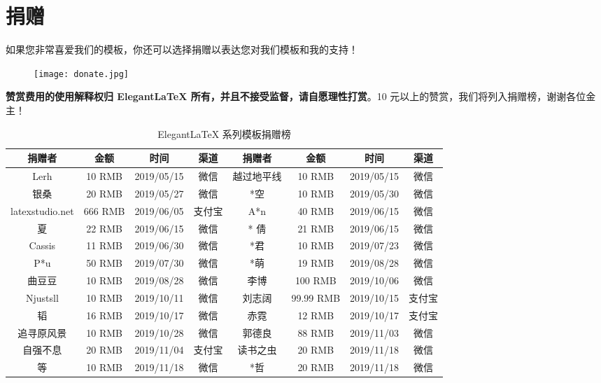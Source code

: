\documentclass[lang=cn,11pt,a4paper,cite=authoryear]{elegantpaper}
\begin{document}
\section{捐赠}
如果您非常喜爱我们的模板，你还可以选择捐赠以表达您对我们模板和我的支持！

\begin{figure}[htbp]
  \centering
  \texttt{[image: donate.jpg]}
\end{figure}

\textbf{赞赏费用的使用解释权归 Elegant\LaTeX{} 所有，并且不接受监督，请自愿理性打赏}。10 元以上的赞赏，我们将列入捐赠榜，谢谢各位金主！


\begin{table}[!htb]
  \centering
  \caption{Elegant\LaTeX{} 系列模板捐赠榜}
    \begin{tabular}{*{4}{>{\scriptsize}c}|*{4}{>{\scriptsize}c}}
    \hline
    \textbf{捐赠者} & \textbf{金额} & \textbf{时间} & \textbf{渠道} & \textbf{捐赠者} & \textbf{金额} & \textbf{时间} & \textbf{渠道} \\
    \hline
    Lerh  & 10 RMB & 2019/05/15 & 微信    & 越过地平线 & 10 RMB & 2019/05/15 & 微信 \\
    银桑    & 20 RMB & 2019/05/27 & 微信    & *空    & 10 RMB & 2019/05/30 & 微信 \\
    latexstudio.net & 666 RMB & 2019/06/05 & 支付宝   & A*n   & 40 RMB & 2019/06/15 & 微信 \\
    * 夏   & 22 RMB & 2019/06/15 & 微信    & * 倩   & 21 RMB  & 2019/06/15 & 微信 \\
    Cassis & 11 RMB & 2019/06/30 & 微信    & *君    & 10 RMB & 2019/07/23 & 微信 \\
    P*u   & 50 RMB & 2019/07/30 & 微信    & *萌    & 19 RMB & 2019/08/28 & 微信 \\
    曲豆豆   & 10 RMB & 2019/08/28 & 微信    & 李博    & 100 RMB & 2019/10/06 & 微信 \\
    Njustsll & 10 RMB & 2019/10/11 & 微信    & 刘志阔   & 99.99 RMB & 2019/10/15 & 支付宝 \\
    * 韬   & 16 RMB & 2019/10/17 & 微信    & 赤霓    & 12 RMB & 2019/10/17 & 支付宝 \\
    追寻原风景 & 10 RMB & 2019/10/28 & 微信    & 郭德良   & 88 RMB & 2019/11/03 & 微信 \\
    自强不息  & 20 RMB & 2019/11/04 & 支付宝   & 读书之虫  & 20 RMB & 2019/11/18 & 微信 \\
    *等    & 10 RMB & 2019/11/18 & 微信    & *哲    & 20 RMB & 2019/11/18 & 微信 \\

\end{tabular}
\end{table}
\end{document}

